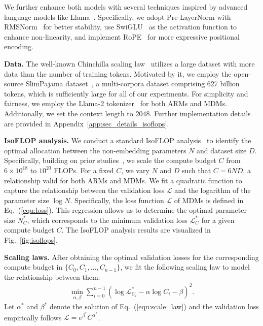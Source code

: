 \documentclass{article} %
\begin{document}
We further enhance both models with several techniques inspired by advanced language models like Llama~\citep{touvron2023llama, touvron2023llama2}. Specifically, we adopt Pre-LayerNorm with RMSNorm~\citep{zhang2019root} for better stability, use SwiGLU~\citep{shazeer2020glu} as the activation function to enhance non-linearity, and implement RoPE~\citep{su2024roformer} for more expressive positional encoding.

\textbf{Data.} The well-known Chinchilla scaling law~\citep{hoffmann2022training} utilizes a large dataset with more data than the number of training tokens. Motivated by it, we employ the open-source SlimPajama dataset~\citep{cerebras2023slimpajama}, a multi-corpora dataset comprising 627 billion tokens, which is sufficiently large for all of our experiments. For simplicity and fairness, we employ the Llama-2 tokenizer~\citep{touvron2023llama2} for both ARMs and MDMs. Additionally, we set the context length to $2048$. Further implementation details are provided in Appendix~\ref{app:sec_details_isoflops}.

\textbf{IsoFLOP analysis.} We conduct a standard IsoFLOP analysis~\citep{hoffmann2022training} to identify the optimal allocation between the non-embedding parameters $N$ and dataset size $D$. Specifically, building on prior studies~\citep{kaplan2020scaling, hoffmann2022training}, we scale the compute budget $C$ from $6 \times 10^{18}$ to $10^{20}$ FLOPs. For a fixed $C$, we vary $N$ and $D$ such that $C = 6 N D$, a relationship valid for both ARMs and MDMs. We fit a quadratic function to capture the relationship between the validation loss $\mathcal{L}$ and the logarithm of the parameter size $\log N$. Specifically, the loss function $\mathcal{L}$ of MDMs is defined in Eq.~(\ref{equ:loss}). This regression allows us to determine the optimal parameter size $N^{*}_C$, which corresponds to the minimum validation loss $\mathcal{L}^{*}_C$ for a given compute budget $C$. The IsoFLOP analysis results are visualized in Fig.~\ref{fig:isoflops}.



\textbf{Scaling laws.} After obtaining the optimal validation losses for the corresponding compute budget in $\{C_0, C_1, \dots, C_{n-1} \}$, we fit the following scaling law to model the relationship between them:
\begin{align}
\label{equ:scale_law}
    \min_{\alpha, \beta} \sum_{i=0}^{n-1} \left( \log \mathcal{L}^*_{C_i} - \alpha \log C_i - \beta \right)^2.
\end{align}
Let ${\alpha^*}$ and ${\beta^*}$ denote the solution of Eq.~(\ref{equ:scale_law}) and the validation loss empirically follows $\mathcal{L} = e^{\beta^*} C^{\alpha^*}$. 
\end{document}

